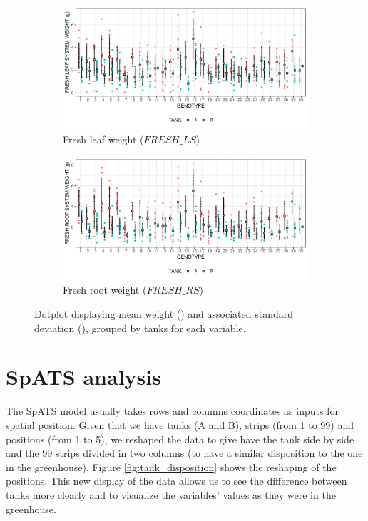 \begin{figure}\ContinuedFloat
	\captionsetup[figure]{list=no}
	\begin{subfigure}[t]{\textwidth}
		\centering
		\includegraphics[width = \textwidth]{../../Figures/FRESH_LS_summary_plot.pdf}
		\caption{Fresh leaf weight ($FRESH\_LS$)}
	\end{subfigure}

	\begin{subfigure}[t]{\textwidth}
		\centering
		\includegraphics[width = \textwidth]{../../Figures/FRESH_RS_summary_plot.pdf}
		\caption{Fresh root weight ($FRESH\_RS$)}
	\end{subfigure}
	\caption[Dotplot of the mean weight and associated standard deviation]{Dotplot displaying mean weight (\protect\emptysquare) and associated standard deviation (\protect\blackline), grouped by tanks for each variable.}
	\label{fig:dotplot_all_variables}
\end{figure}

\section{SpATS analysis}
The SpATS model usually takes rows and columns coordinates as inputs for spatial position. Given that we have tanks (A and B), strips (from 1 to 99) and positions (from 1 to 5), we reshaped the data to give have the tank side by side and the 99 strips divided in two columns (to have a similar disposition to the one in the greenhouse). Figure \ref{fig:tank_disposition} shows the reshaping of the positions. This new display of the data allows us to see the difference between tanks more clearly and to visualize the variables' values as they were in the greenhouse.


